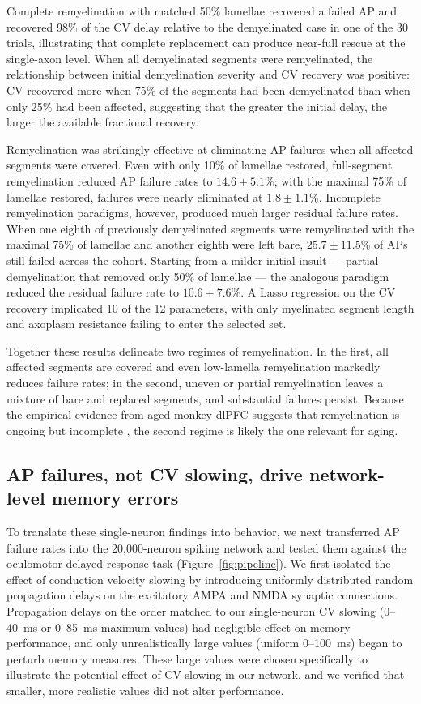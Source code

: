 \documentclass[11pt]{article}
\begin{document}
Complete remyelination with matched 50\% lamellae recovered a failed AP and recovered 98\% of the CV delay relative to the demyelinated case in one of the 30 trials, illustrating that complete replacement can produce near-full rescue at the single-axon level. When all demyelinated segments were remyelinated, the relationship between initial demyelination severity and CV recovery was positive: CV recovered more when 75\% of the segments had been demyelinated than when only 25\% had been affected, suggesting that the greater the initial delay, the larger the available fractional recovery.

Remyelination was strikingly effective at eliminating AP failures when all affected segments were covered. Even with only 10\% of lamellae restored, full-segment remyelination reduced AP failure rates to $14.6 \pm 5.1\%$; with the maximal 75\% of lamellae restored, failures were nearly eliminated at $1.8 \pm 1.1\%$. Incomplete remyelination paradigms, however, produced much larger residual failure rates. When one eighth of previously demyelinated segments were remyelinated with the maximal 75\% of lamellae and another eighth were left bare, $25.7 \pm 11.5\%$ of APs still failed across the cohort. Starting from a milder initial insult --- partial demyelination that removed only 50\% of lamellae --- the analogous paradigm reduced the residual failure rate to $10.6 \pm 7.6\%$. A Lasso regression on the CV recovery implicated 10 of the 12 parameters, with only myelinated segment length and axoplasm resistance failing to enter the selected set.

Together these results delineate two regimes of remyelination. In the first, all affected segments are covered and even low-lamella remyelination markedly reduces failure rates; in the second, uneven or partial remyelination leaves a mixture of bare and replaced segments, and substantial failures persist. Because the empirical evidence from aged monkey dlPFC suggests that remyelination is ongoing but incomplete \citep{peters2003remyelination,dimovasili2022oligodendrocyte}, the second regime is likely the one relevant for aging.

\subsection{AP failures, not CV slowing, drive network-level memory errors}

To translate these single-neuron findings into behavior, we next transferred AP failure rates into the 20{,}000-neuron spiking network and tested them against the oculomotor delayed response task (Figure~\ref{fig:pipeline}). We first isolated the effect of conduction velocity slowing by introducing uniformly distributed random propagation delays on the excitatory AMPA and NMDA synaptic connections. Propagation delays on the order matched to our single-neuron CV slowing (0--40~ms or 0--85~ms maximum values) had negligible effect on memory performance, and only unrealistically large values (uniform 0--100~ms) began to perturb memory measures. These large values were chosen specifically to illustrate the potential effect of CV slowing in our network, and we verified that smaller, more realistic values did not alter performance.
\end{document}
